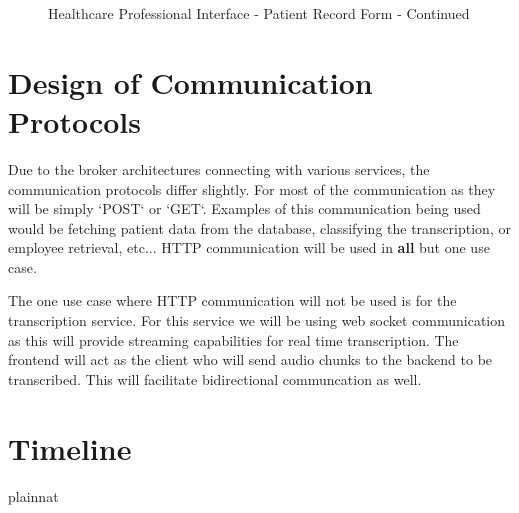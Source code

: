 \documentclass[12pt, titlepage]{article}
\begin{document}
\begin{figure}[h!]
    \centering
    \caption{Healthcare Professional Interface - Patient Record Form - Continued}
    \label{fig:healthcare-interface-2}
\end{figure}

\section{Design of Communication Protocols}

Due to the broker architectures connecting with various services, the communication protocols differ slightly. For most of the communication as they will be simply `POST` or `GET`. Examples of this communication being used would be fetching patient data from the database, classifying the transcription, or employee retrieval, etc... HTTP communication will be used in \textbf{all} but one use case.

The one use case where HTTP communication will not be used is for the transcription service. For this service we will be using web socket communication as this will provide streaming capabilities for real time transcription. The frontend will act as the client who will send audio chunks to the backend to be transcribed. This will facilitate bidirectional communcation as well.


\section{Timeline}



 {plainnat}


\newpage{}
\end{document}
